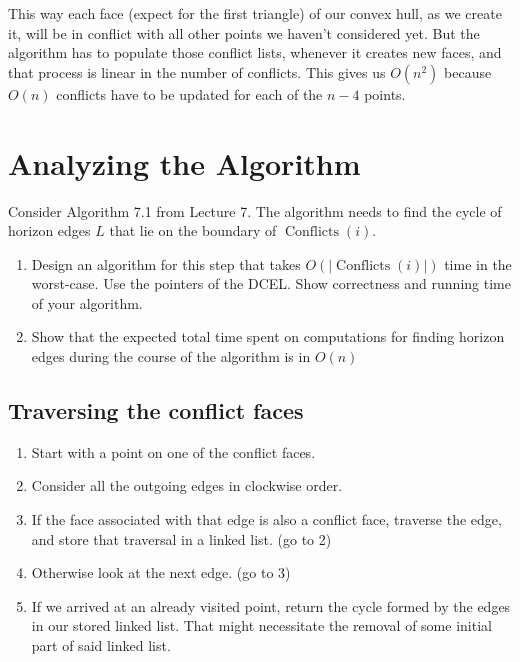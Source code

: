 \documentclass{article}
\begin{document}
  This way each face (expect for the first triangle) of our convex hull, as we create it,
  will be in conflict with all other points we haven't considered yet.
  But the algorithm has to populate those conflict lists,
  whenever it creates new faces, and that process is linear in the number of conflicts.
  This gives us $O(n^2)$ because $O(n)$ conflicts have to be updated for each of the $n-4$ points.

  \section{Analyzing the Algorithm}
  \begin{centerframebox}
    Consider Algorithm 7.1 from Lecture 7. The algorithm needs to find the cycle of horizon
    edges $L$ that lie on the boundary of $\operatorname{Conflicts}(i)$.
    \begin{enumerate}[label=(\alph*)]
      \item Design an algorithm for this step that takes $O(|\operatorname{Conflicts}(i)|)$ time in the worst-case.
      Use the pointers of the DCEL. Show correctness and running time of your algorithm.
      \item Show that the expected total time spent on computations for finding horizon edges during
      the course of the algorithm is in $O(n)$
    \end{enumerate}
  \end{centerframebox}

  \subsection{Traversing the conflict faces}
  \begin{enumerate}
    \item Start with a point on one of the conflict faces.
    \item Consider all the outgoing edges in clockwise order.
    \item If the face associated with that edge is also a conflict face, traverse the edge,
          and store that traversal in a linked list. (go to 2)
    \item Otherwise look at the next edge. (go to 3)
    \item If we arrived at an already visited point, return the cycle formed by the edges in our stored linked list.
          That might necessitate the removal of some initial part of said linked list.
  \end{enumerate}
\end{document}
